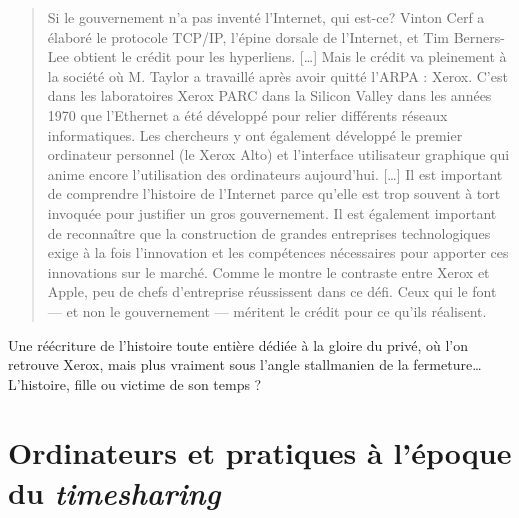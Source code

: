 \documentclass{FramateX}
\begin{document}
\begin{refsection}
\begin{quote}
Si le gouvernement n'a pas inventé
l'Internet, qui est-ce? Vinton Cerf a élaboré le
protocole TCP/IP, l'épine dorsale de
l'Internet, et Tim Berners-Lee obtient le crédit pour
les hyperliens. [\ldots] Mais le crédit va pleinement à la société où M.
Taylor a travaillé après avoir quitté l'ARPA : Xerox.
C'est dans les laboratoires Xerox PARC dans la Silicon
Valley dans les années 1970 que l'Ethernet a été
développé pour relier différents réseaux informatiques. Les chercheurs
y ont également développé le premier ordinateur personnel (le Xerox
Alto) et l'interface utilisateur graphique qui anime
encore l'utilisation des ordinateurs
aujourd'hui. [\ldots] Il est important de comprendre
l'histoire de l'Internet parce
qu'elle est trop souvent à tort invoquée pour
justifier un gros gouvernement. Il est également important de
reconnaître que la construction de grandes entreprises technologiques
exige à la fois l'innovation et les compétences
nécessaires pour apporter ces innovations sur le marché. Comme le
montre le contraste entre Xerox et Apple, peu de chefs
d'entreprise réussissent dans ce défi. Ceux qui le
font — et non le gouvernement — méritent le crédit pour ce
qu'ils
réalisent.
\end{quote}

Une réécriture de l'histoire toute
entière dédiée à la gloire du privé, où l'on retrouve
Xerox, mais plus vraiment sous l'angle stallmanien de
la fermeture\ldots L'histoire, fille ou victime de son
temps ? 

\nocite{beltranhistoire2007,bygraveinternet2009,denardisopening2011,
flichyimaginaire2001,goldsmithwho2006,lecrosniernautralite2011,
musianimodeinternet2011,quatermanmatrix1989,salusquarter1994,
vanschewickinternet2010}








\printbibliography[heading=subbibliography]
\end{refsection}


\chapter*{Ordinateurs et pratiques à l'époque du \textit{timesharing}}
{}
\end{document}
